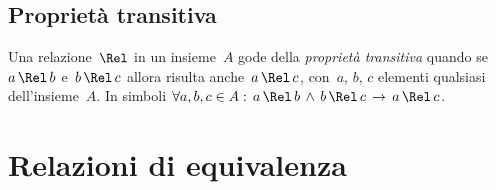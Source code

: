 \subsection{Proprietà transitiva}
%
%
%
% 
% 

\begin{definizione}
Una relazione~$\Rel$ in un insieme~$A$ gode della \emph{proprietà transitiva} quando se~$a \,\Rel\, b$ e~$b \,\Rel\, c$
allora risulta anche~$a \,\Rel\, c$, con~$a$, $b$, $c$ elementi qualsiasi dell'insieme~$A$.
In simboli $\forall a, b, c \in A:\, a\, \Rel\, b\, \wedge\, b\,\Rel\,c\,\rightarrow\,a\,\Rel\,c$.
\end{definizione}

\ovalbox{\risolvii \ref{ese:7.22}, \ref{ese:7.23}, \ref{ese:7.24}, \ref{ese:7.25}}
\pagebreak
\section{Relazioni di equivalenza}

